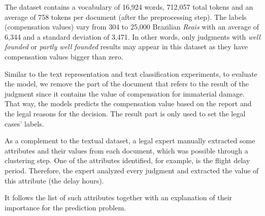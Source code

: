 The dataset contains a vocabulary of 16,924 words, 712,057 total tokens and an average of 758 tokens per document (after the preprocessing step). The labels (compensation values) vary from 304 to 25,000 Brazilian \textit{Reais} with an average of 6,344 and a standard deviation of 3,471. In other words, only judgments with \textit{well founded} or \textit{partly well founded} results may appear in this dataset as they have compensation values bigger than zero.


Similar to the text representation and text classification experiments, to evaluate the model, we remove the part of the document that refers to the result of the judgment since it contains the value of compensation for immaterial damage. That way, the models predicts the compensation value based on the report and the legal reasons for the decision. 
The result part is only used to set the legal cases' labels. 


As a complement to the textual dataset, a legal expert manually extracted some attributes and their values from each document, which was possible through a clustering step. 
One of the attributes identified, for example, is the flight delay period. Therefore, the expert analyzed every judgment and extracted the value of this attribute (the delay hours).

It follows the list of such attributes together with an explanation of their importance for the prediction problem.

